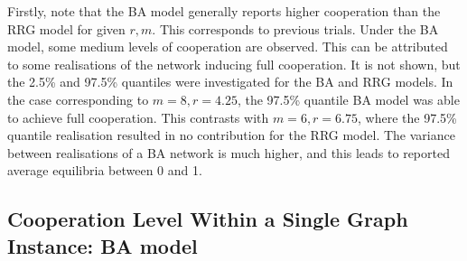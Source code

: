 \FloatBarrier

Firstly, note that the BA model generally reports higher cooperation than the RRG model for given $r,m$. This corresponds to previous trials. Under the BA model, some medium levels of cooperation are observed. This can be attributed to some realisations of the network inducing full cooperation. It is not shown, but the 2.5\% and 97.5\% quantiles were investigated for the BA and RRG models. In the case corresponding to $m=8, r = 4.25$, the 97.5\% quantile BA model was able to achieve full cooperation. This contrasts with $m=6, r = 6.75$, where the 97.5\% quantile realisation resulted in no contribution for the RRG model. The variance between realisations of a BA network is much higher, and this leads to reported average equilibria between 0 and 1. 

\subsection{Cooperation Level Within a Single Graph Instance: BA model } 



